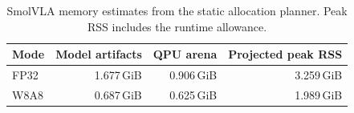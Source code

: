 \documentclass[sigplan,screen,review]{acmart}
\begin{document}
\begin{table}[t]
\centering
\caption{Channel-partitioned FFN latency against CPU\_REPACK. Prompts use five processes per implementation; cached requests use 15 process pairs. Each cached request adds 128 tokens to a prepopulated 512-token prefix and returns one token; prefix population is excluded.}
\label{tab:ffn-requests}
\small
{}
\end{table}


\begin{table}[t]
\centering
\caption{SmolVLA memory estimates from the static allocation planner. Peak RSS includes the runtime allowance.}
\label{tab:memory}
\small
\begin{tabular}{@{}lrrr@{}}
\toprule
Mode & Model artifacts & QPU arena & Projected peak RSS \\
\midrule
FP32 & 1.677\,GiB & 0.906\,GiB & 3.259\,GiB \\
W8A8 & 0.687\,GiB & 0.625\,GiB & 1.989\,GiB \\
\bottomrule
\end{tabular}
\end{table}
\end{document}
